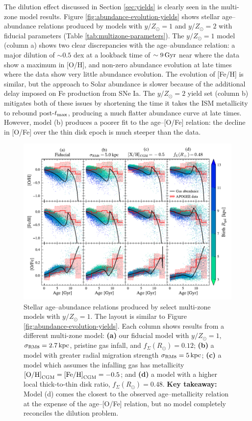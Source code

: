 \documentclass[twocolumn,twocolappendix,linenumbers]{aastex631}
\newcommand{\mathOH}{{\rm [O/H]}}
\newcommand{\mathFeH}{{\rm [Fe/H]}}
\newcommand{\yZ}[1]{$y/Z_\odot=#1$}
\begin{document}
The dilution effect discussed in Section \ref{sec:yields} is clearly seen in the multi-zone model results. Figure \ref{fig:abundance-evolution-yields} shows stellar age--abundance relations produced by models with \yZ{1} and \yZ{2} with fiducial parameters (Table \ref{tab:multizone-parameters}). The \yZ{1} model (column a) shows two clear discrepancies with the \citet{leung_variational_2023} age--abundance relation: a major dilution of $\sim0.5$ dex at a lookback time of $\sim9\,{\rm Gyr}$ near where the data show a maximum in [O/H], and non-zero abundance evolution at late times where the data show very little abundance evolution. The evolution of [Fe/H] is similar, but the approach to Solar abundance is slower because of the additional delay imposed on Fe production from SNe Ia. The \yZ{2} yield set (column b) mitigates both of these issues by shortening the time it takes the ISM metallicity to rebound post-$t_{\rm max}$, producing a much flatter abundance curve at late times. However, model (b) produces a poorer fit to the age--[O/Fe] relation: the decline in [O/Fe] over the thin disk epoch is much steeper than the data.

\begin{figure}
    \centering
    \includegraphics{figures/abundance_evolution_params.pdf}
    \caption{Stellar age--abundance relations produced by select multi-zone models with \yZ{1}. The layout is similar to Figure \ref{fig:abundance-evolution-yields}. Each column shows results from a different multi-zone model: {\bf (a)} our fiducial model with $y/Z_\odot=1$, $\sigma_{\rm RM8}=2.7\,{\rm kpc}$, pristine gas infall, and $f_\Sigma(R_\odot)=0.12$; {\bf (b)} a model with greater radial migration strength $\sigma_{\rm RM8}=5\,{\rm kpc}$; {\bf (c)} a model which assumes the infalling gas has metallicity $\mathOH_{\rm CGM}=\mathFeH_{\rm CGM}=-0.5$; and {\bf (d)} a model with a higher local thick-to-thin disk ratio, $f_\Sigma(R_\odot)=0.48$. {\bf Key takeaway:} Model (d) comes the closest to the observed age--metallicity relation at the expense of the age--[O/Fe] relation, but no model completely reconciles the dilution problem.}
    \label{fig:abundance-evolution-params}
\end{figure}
\end{document}

